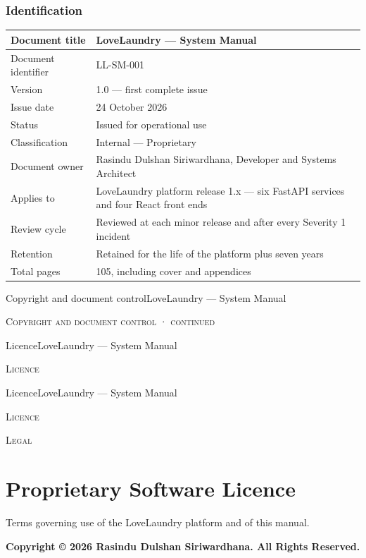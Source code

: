 \documentclass[11pt,a4paper,oneside]{book}
\begin{document}
\subsection*{Identification}
\begin{center}\small
\begin{tabularx}{\linewidth}{|X|X|}
\hline
Document title & LoveLaundry — System Manual \\ \hline
Document identifier & LL-SM-001 \\ \hline
Version & 1.0 — first complete issue \\ \hline
Issue date & 24 October 2026 \\ \hline
Status & Issued for operational use \\ \hline
Classification & Internal — Proprietary \\ \hline
Document owner & Rasindu Dulshan Siriwardhana, Developer and Systems Architect \\ \hline
Applies to & LoveLaundry platform release 1.x — six FastAPI services and four React front ends \\ \hline
Review cycle & Reviewed at each minor release and after every Severity 1 incident \\ \hline
Retention & Retained for the life of the platform plus seven years \\ \hline
Total pages & 105, including cover and appendices \\ \hline
\end{tabularx}
\end{center}
Copyright and document controlLoveLaundry — System Manual

\textsc{\small\color{crimson}Copyright and document control · continued}\par\medskip
LicenceLoveLaundry — System Manual

\textsc{\small\color{crimson}Licence}\par\medskip
LicenceLoveLaundry — System Manual

\textsc{\small\color{crimson}Licence}\par\medskip
\textsc{\small\color{crimson}Legal}\par\medskip
\chapter{Proprietary Software Licence}
Terms governing use of the LoveLaundry platform and of this manual.

\textbf{Copyright © 2026 Rasindu Dulshan Siriwardhana. All Rights Reserved.}
\end{document}
